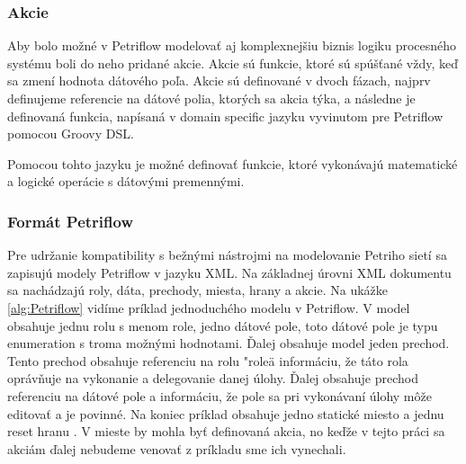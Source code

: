 \subsubsection{Akcie}
Aby bolo možné v Petriflow modelovať aj komplexnejšiu biznis logiku procesného systému boli do neho pridané akcie. Akcie sú funkcie, ktoré sú spúšťané vždy, keď sa zmení hodnota dátového poľa. Akcie sú definované v dvoch fázach, najprv definujeme referencie na dátové polia, ktorých sa akcia týka, a následne je definovaná funkcia, napísaná v domain specific jazyku vyvinutom pre Petriflow pomocou Groovy DSL. 

Pomocou tohto jazyku je možné definovať funkcie, ktoré vykonávajú matematické a logické operácie s dátovými premennými. 

\subsubsection{Formát Petriflow}
Pre udržanie kompatibility s bežnými nástrojmi na modelovanie Petriho sietí sa zapisujú modely Petriflow v jazyku XML. Na základnej úrovni XML dokumentu sa nachádzajú roly, dáta, prechody, miesta, hrany a akcie. Na ukážke \ref{alg:Petriflow} vidíme príklad jednoduchého modelu v Petriflow. 
V model obsahuje jednu rolu s menom role, 
jedno dátové pole, toto dátové pole je typu enumeration s troma možnými hodnotami. 
Ďalej obsahuje model jeden prechod. Tento prechod obsahuje referenciu na rolu "role\" a informáciu, že táto rola oprávňuje na vykonanie a delegovanie danej úlohy. Ďalej obsahuje prechod referenciu na dátové pole a informáciu, že pole sa pri vykonávaní úlohy môže editovať a je povinné.
Na koniec príklad obsahuje jedno statické miesto a jednu reset hranu . V mieste by mohla byť definovaná akcia, no keďže v tejto práci sa akciám ďalej nebudeme venovať z príkladu sme ich vynechali.


